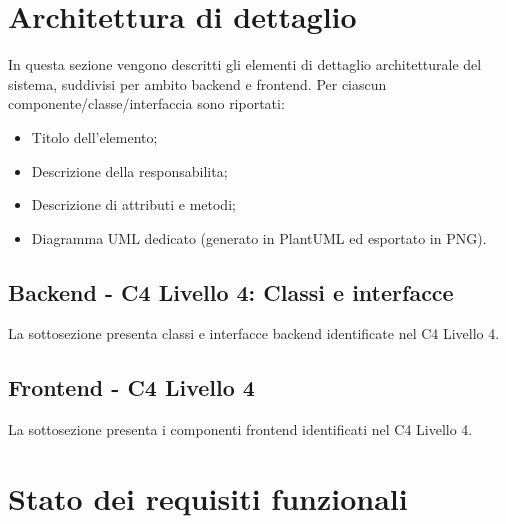 \documentclass[a4paper, 11pt, oneside]{scrartcl}
\begin{document}
\section{Architettura di dettaglio}

In questa sezione vengono descritti gli elementi di dettaglio architetturale del sistema, suddivisi per ambito backend e frontend.
Per ciascun componente/classe/interfaccia sono riportati:
\begin{itemize}
    \item Titolo dell'elemento;
    \item Descrizione della responsabilita;
    \item Descrizione di attributi e metodi;
    \item Diagramma UML dedicato (generato in PlantUML ed esportato in PNG).
\end{itemize}

\subsection{Backend - C4 Livello 4: Classi e interfacce}
La sottosezione presenta classi e interfacce backend identificate nel C4 Livello 4.







\subsection{Frontend - C4 Livello 4}
La sottosezione presenta i componenti frontend identificati nel C4 Livello 4.







\newpage
\section{Stato dei requisiti funzionali}
\end{document}
